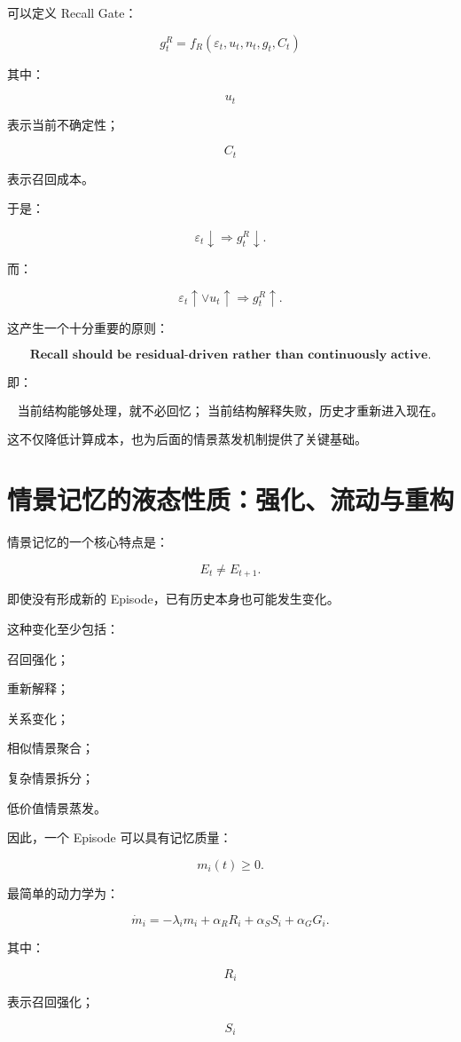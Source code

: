 可以定义 Recall Gate：

\[
g_t^R
=
f_R
\left(
\varepsilon_t,
u_t,
n_t,
g_t,
C_t
\right)
\]

其中：

\[
u_t
\]

表示当前不确定性；

\[
C_t
\]

表示召回成本。

于是：

\[
\boxed{
\varepsilon_t\downarrow
\Rightarrow
g_t^R\downarrow.
}
\]

而：

\[
\boxed{
\varepsilon_t\uparrow
\lor
u_t\uparrow
\Rightarrow
g_t^R\uparrow.
}
\]

这产生一个十分重要的原则：

\[
\boxed{
\textbf{
Recall should be residual-driven rather than continuously active.
}
}
\]

即：

\[
\boxed{
\text{当前结构能够处理，就不必回忆；
当前结构解释失败，历史才重新进入现在。}
}
\]

这不仅降低计算成本，也为后面的情景蒸发机制提供了关键基础。


\section{情景记忆的液态性质：强化、流动与重构}

情景记忆的一个核心特点是：

\[
\boxed{
E_t\neq E_{t+1}.
}
\]

即使没有形成新的 Episode，已有历史本身也可能发生变化。

这种变化至少包括：

召回强化；

重新解释；

关系变化；

相似情景聚合；

复杂情景拆分；

低价值情景蒸发。

因此，一个 Episode 可以具有记忆质量：

\[
m_i(t)\ge0.
\]

最简单的动力学为：

\[
\boxed{
\dot m_i
=
-\lambda_i m_i
+
\alpha_RR_i
+
\alpha_SS_i
+
\alpha_GG_i.
}
\]

其中：

\[
R_i
\]

表示召回强化；

\[
S_i
\]

